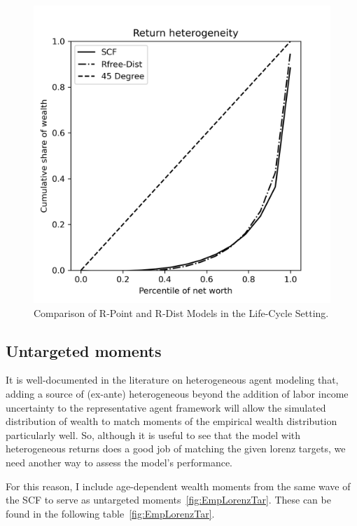 \begin{figure}[h]
\begin{minipage}{0.48\textwidth}
        \includegraphics[width=\textwidth]{../Figures/LCrrDistNetWorthPlot.png}
    \end{minipage}
    \caption{Comparison of R-Point and R-Dist Models in the Life-Cycle Setting.}
    \label{fig:LCUnif} 
\end{figure}

\subsection{Untargeted moments}

\par It is well-documented in the literature on heterogeneous agent modeling that, adding a source of (ex-ante) heterogeneous beyond the addition of labor income uncertainty to the representative agent framework will allow the simulated distribution of wealth to match moments of the empirical wealth distribution particularly well. So, although it is useful to see that the model with heterogeneous returns does a good job of matching the given lorenz targets, we need another way to assess the model's performance.

\par For this reason, I include age-dependent wealth moments from the same wave of the SCF to serve as untargeted moments~\ref{fig:EmpLorenzTar}. These can be found in the following table~\ref{fig:EmpLorenzTar}.

